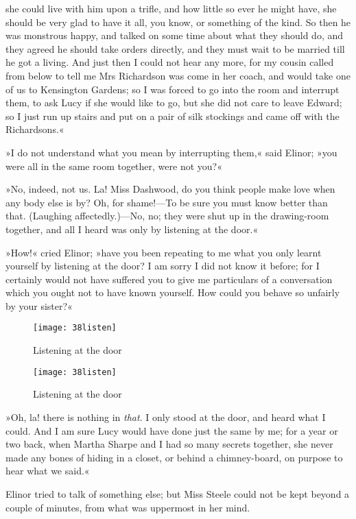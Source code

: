 she could live with him upon a trifle, and how little so ever he might have, she should be very glad to have it all, you know, or something of the kind. So then he was monstrous happy, and talked on some time about what they should do, and they agreed he should take orders directly, and they must wait to be married till he got a living. And just then I could not hear any more, for my cousin called from below to tell me Mrs Richardson was come in her coach, and would take one of us to Kensington Gardens; so I was forced to go into the room and interrupt them, to ask Lucy if she would like to go, but she did not care to leave Edward; so I just run up stairs and put on a pair of silk stockings and came off with the Richardsons.«

»I do not understand what you mean by interrupting them,« said Elinor; »you were all in the same room together, were not you?«

»No, indeed, not us. La! Miss Dashwood, do you think people make love when any body else is by? Oh, for shame!—To be sure you must know better than that. (Laughing affectedly.)—No, no; they were shut up in the drawing-room together, and all I heard was only by listening at the door.«

»How!« cried Elinor; »have you been repeating to me what you only learnt yourself by listening at the door? I am sorry I did not know it before; for I certainly would not have suffered you to give me particulars of a conversation which you ought not to have known yourself. How could you behave so unfairly by your sister?«


\makeatletter
{}
{%
\begin{figure}[tbph]
\centering
\texttt{[image: 38listen]}
\caption{Listening at the door}
\end{figure}
}{%
\begin{figure}[tbph]
\centering
\texttt{[image: 38listen]}
\caption{Listening at the door}
\end{figure}
}
\makeatother



»Oh, la! there is nothing in \textit{that}. I only stood at the door, and heard what I could. And I am sure Lucy would have done just the same by me; for a year or two back, when Martha Sharpe and I had so many secrets together, she never made any bones of hiding in a closet, or behind a chimney-board, on purpose to hear what we said.«

Elinor tried to talk of something else; but Miss Steele could not be kept beyond a couple of minutes, from what was uppermost in her mind.

